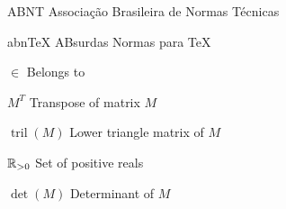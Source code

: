 \begin{siglas}
    \item[ABNT] Associação Brasileira de Normas Técnicas
    \item[abnTeX] ABsurdas Normas para TeX
  \end{siglas}
  
  \begin{simbolos}
    \item[$\in$] Belongs to 
    \item[$M^T$] Transpose of matrix $M$
    \item[$\operatorname{tril}(M)$] Lower triangle matrix of $M$
    \item[$\mathbb{R}_{>0}$] Set of positive reals
    \item[$\det(M)$] Determinant of $M$ 
  \end{simbolos}